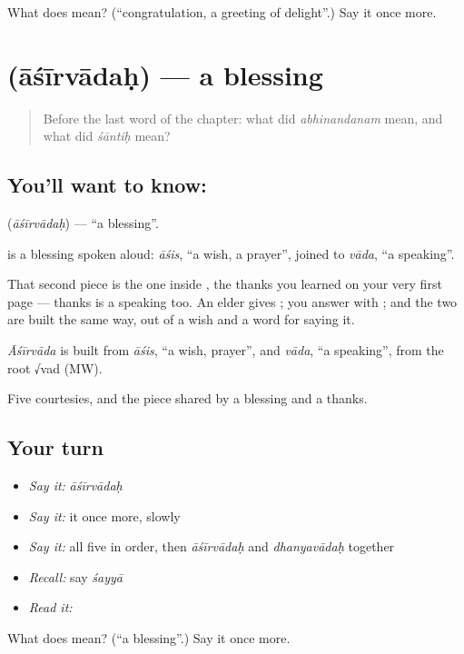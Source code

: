 \begin{tcolorbox}[breakable,colback=teal!4,colframe=teal!35!black,title={Before you move on}]
What does  mean? (\textquotedblleft{}congratulation, a greeting of delight\textquotedblright{}.) Say it once more.
\end{tcolorbox}
\section[\texorpdfstring{\sk{आशीर्वादः} (āśīrvādaḥ)}{आशीर्वादः (āśīrvādaḥ)}]{ (āśīrvādaḥ) — a blessing}

\label{lesson:SA-C37-blessing}



\begin{quote}
Before the last word of the chapter: what did \emph{abhinandanam} mean, and what did \emph{śāntiḥ} mean?
\end{quote}

\subsection*{You'll want to know: }
\textbf{} (\emph{āśīrvādaḥ}) — \textquotedblleft{}a blessing\textquotedblright{}.

\textbf{} is a blessing spoken aloud: \emph{āśis}, \textquotedblleft{}a wish, a prayer\textquotedblright{}, joined to \emph{vāda}, \textquotedblleft{}a speaking\textquotedblright{}.

That second piece is the one inside \textbf{}, the thanks you learned on your very first page — thanks is a speaking too. An elder gives \textbf{}; you answer with \textbf{}; and the two are built the same way, out of a wish and a word for saying it.

\begin{cousinweb}
\emph{Āśīrvāda} is built from \emph{āśis}, \textquotedblleft{}a wish, prayer\textquotedblright{}, and \emph{vāda}, \textquotedblleft{}a speaking\textquotedblright{}, from the root √vad (MW).
\end{cousinweb}

\begin{grammarlens}[title={What you've built}]
Five courtesies, and the piece shared by a blessing and a thanks.
\end{grammarlens}

\subsection*{Your turn}
\begin{itemize}
\raggedright
  \item \emph{Say it:} \emph{āśīrvādaḥ}
  \item \emph{Say it:} it once more, slowly
  \item \emph{Say it:} all five in order, then \emph{āśīrvādaḥ} and \emph{dhanyavādaḥ} together
  \item \emph{Recall:} say \emph{śayyā}
  \item \emph{Read it:} \textbf{}
\end{itemize}

\begin{tcolorbox}[breakable,colback=teal!4,colframe=teal!35!black,title={Before you move on}]
What does  mean? (\textquotedblleft{}a blessing\textquotedblright{}.) Say it once more.
\end{tcolorbox}
